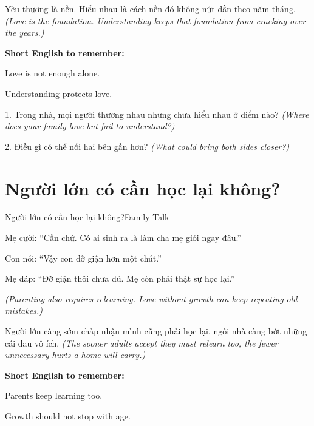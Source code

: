 \begin{baihoc}
Yêu thương là nền. Hiểu nhau là cách nền đó không nứt dần theo năm tháng.
\textit{(Love is the foundation. Understanding keeps that foundation from cracking over the years.)}
\end{baihoc}

\begin{ghinhoanh}
\textbf{Short English to remember:}

Love is not enough alone.

Understanding protects love.
\end{ghinhoanh}

\begin{tuhocnhanh}
1. Trong nhà, mọi người thương nhau nhưng chưa hiểu nhau ở điểm nào? \textit{(Where does your family love but fail to understand?)}

2. Điều gì có thể nối hai bên gần hơn? \textit{(What could bring both sides closer?)}
\end{tuhocnhanh}
\ngancach

\section{Người lớn có cần học lại không?}
\begin{truyen}{Người lớn có cần học lại không?}{Family Talk}

Mẹ cười: ``Cần chứ. Có ai sinh ra là làm cha mẹ giỏi ngay đâu.''

Con nói: ``Vậy con đỡ giận hơn một chút.''

Mẹ đáp: ``Đỡ giận thôi chưa đủ. Mẹ còn phải thật sự học lại.''

\textit{(Parenting also requires relearning. Love without growth can keep repeating old mistakes.)}
\end{truyen}

\begin{baihoc}
Người lớn càng sớm chấp nhận mình cũng phải học lại, ngôi nhà càng bớt những cái đau vô ích.
\textit{(The sooner adults accept they must relearn too, the fewer unnecessary hurts a home will carry.)}
\end{baihoc}

\begin{ghinhoanh}
\textbf{Short English to remember:}

Parents keep learning too.

Growth should not stop with age.
\end{ghinhoanh}

